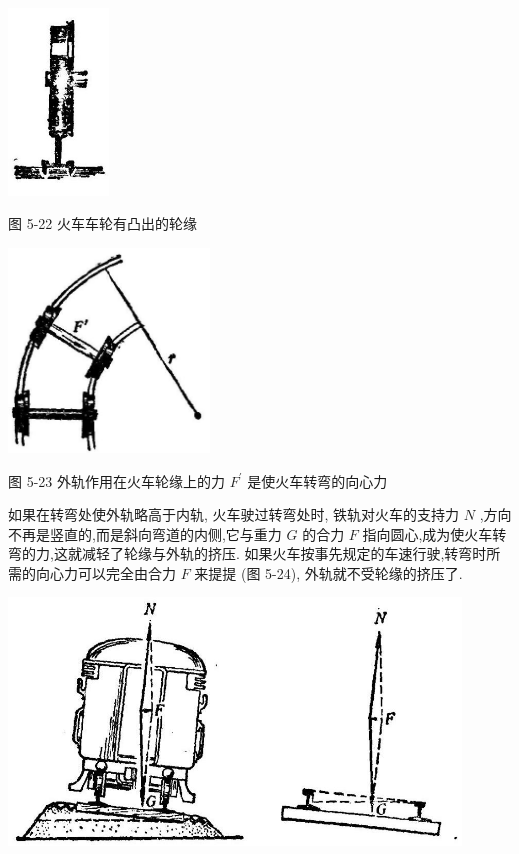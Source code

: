 \documentclass[10pt]{article}
\begin{document}
\begin{center}
\includegraphics[max width=0.2\textwidth]{images/01912d55-147c-70aa-b0e0-1782a122f948_148_667523.jpg}
\end{center}

图 5-22 火车车轮有凸出的轮缘

\begin{center}
\includegraphics[max width=0.4\textwidth]{images/01912d55-147c-70aa-b0e0-1782a122f948_148_247769.jpg}
\end{center}

图 5-23 外轨作用在火车轮缘上的力 \({F}^{\prime }\) 是使火车转弯的向心力

如果在转弯处使外轨略高于内轨, 火车驶过转弯处时, 铁轨对火车的支持力 \(N\) ,方向不再是竖直的,而是斜向弯道的内侧,它与重力 \(G\) 的合力 \(F\) 指向圆心,成为使火车转弯的力,这就减轻了轮缘与外轨的挤压. 如果火车按事先规定的车速行驶,转弯时所需的向心力可以完全由合力 \(F\) 来提提 (图 5-24), 外轨就不受轮缘的挤压了.

\begin{center}
\includegraphics[max width=0.9\textwidth]{images/01912d55-147c-70aa-b0e0-1782a122f948_148_988475.jpg}
\end{center}
\end{document}

